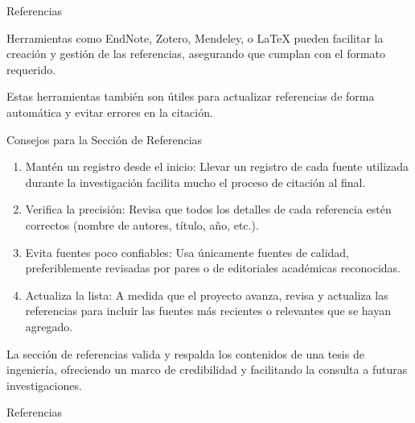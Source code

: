 \documentclass[9pt]{beamer}
\begin{document}
\begin{frame}{Referencias}
\begin{enumerate}
    Herramientas como EndNote, Zotero, Mendeley, o LaTeX pueden facilitar la creación y gestión de las referencias, asegurando que cumplan con el formato requerido.

    Estas herramientas también son útiles para actualizar referencias de forma automática y evitar errores en la citación.
\end{enumerate}

Consejos para la Sección de Referencias

\begin{enumerate}
    \item Mantén un registro desde el inicio: Llevar un registro de cada fuente utilizada durante la investigación facilita mucho el proceso de citación al final.
    \item Verifica la precisión: Revisa que todos los detalles de cada referencia estén correctos (nombre de autores, título, año, etc.).
    \item Evita fuentes poco confiables: Usa únicamente fuentes de calidad, preferiblemente revisadas por pares o de editoriales académicas reconocidas.
    \item Actualiza la lista: A medida que el proyecto avanza, revisa y actualiza las referencias para incluir las fuentes más recientes o relevantes que se hayan agregado.
\end{enumerate}

La sección de referencias valida y respalda los contenidos de una tesis de ingeniería, ofreciendo un marco de credibilidad y facilitando la consulta a futuras investigaciones.
\end{frame}
\begin{frame}[allowframebreaks]{Referencias}
  \nocite{*}
  
  
\end{frame}
\end{document}
